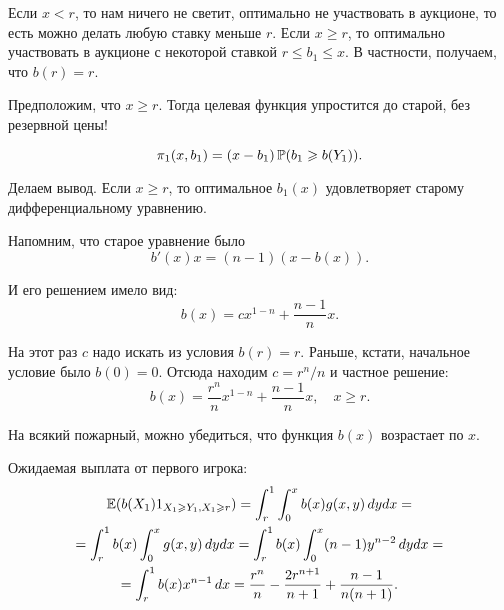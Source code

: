 \begin{enumerate}
Если $ x<r $, то нам ничего не светит, оптимально не участвовать в аукционе, то есть можно делать любую ставку меньше $ r $. Если $ x\geq r $, то оптимально участвовать в аукционе с некоторой ставкой $ r\leq b_{1}\leq x $. В частности, получаем, что $ b(r)=r$.



Предположим, что $ x\geq r $. Тогда целевая функция упростится до старой, без резервной цены!

\begin{equation}
\pi_{1}(x,b_{1})=(x-b_{1})\P(b_{1}\geq b(Y_{1})).
\end{equation}

Делаем вывод. Если $x\geq r$, то оптимальное $ b_{1}(x) $ удовлетворяет старому дифференциальному уравнению.

Напомним, что старое уравнение было
\begin{equation}
b'(x)x=(n-1)(x-b(x)).
\end{equation}

И его решением имело вид:
\begin{equation}
b(x)=cx^{1-n}+\frac{n-1}{n}x.
\end{equation}

На этот раз $ c $ надо искать из условия $ b(r)=r $. Раньше, кстати, начальное условие было $b(0)=0 $. Отсюда находим $ c=r^{n}/n $ и частное решение:
\begin{equation}
b(x)=\frac{r^{n}}{n}x^{1-n}+\frac{n-1}{n}x, \quad x\geq r.
\end{equation}

На всякий пожарный, можно убедиться, что функция $b(x)$ возрастает по $ x $.

Ожидаемая выплата от первого игрока:
\begin{multline}
\E(b(X_{1})1_{X_{1}\geq Y_{1},X_{1}\geq r})=\int_{r}^{1} \int_{0}^{x} b(x)g(x,y) \, dy dx =\\
=\int_{r}^{1} b(x) \int_{0}^{x} g(x,y) \, dy dx =\int_{r}^{1} b(x) \int_{0}^{x} (n-1) y^{n-2} \, dy dx =\\
=\int_{r}^{1}b(x) x^{n-1} \, dx =
\frac{r^{n}}{n}-\frac{2r^{n+1}}{n+1}+\frac{n-1}{n(n+1)}.
\end{multline}


\end{enumerate}
